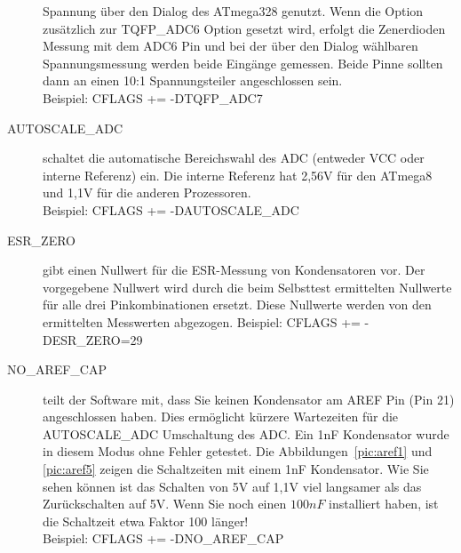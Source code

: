 \begin{description}
Spannung über den Dialog des ATmega328 genutzt. Wenn die Option zusätzlich zur TQFP\_ADC6 Option gesetzt wird,
erfolgt die Zenerdioden Messung mit dem ADC6 Pin und bei der über den Dialog wählbaren Spannungsmessung werden
beide Eingänge gemessen. Beide Pinne sollten dann an einen 10:1 Spannungsteiler angeschlossen sein.\\
Beispiel: CFLAGS += -DTQFP\_ADC7
  \item[AUTOSCALE\_ADC] schaltet die automatische Bereichswahl des ADC (entweder VCC oder interne Referenz) ein.
Die interne Referenz hat 2,56V für den ATmega8 und 1,1V für die anderen Prozessoren.\\
Beispiel: CFLAGS += -DAUTOSCALE\_ADC
  \item[ESR\_ZERO] gibt einen Nullwert für die ESR-Messung von Kondensatoren vor.
Der vorgegebene Nullwert wird durch die beim Selbsttest ermittelten Nullwerte für alle drei Pinkombinationen ersetzt.
 Diese Nullwerte werden von den ermittelten Messwerten abgezogen.
Beispiel: CFLAGS += -DESR\_ZERO=29
  \item[NO\_AREF\_CAP] teilt der Software mit, dass Sie keinen Kondensator am AREF Pin (Pin 21) angeschlossen haben.
Dies ermöglicht kürzere Wartezeiten für die AUTOSCALE\_ADC Umschaltung des ADC.
Ein 1nF Kondensator wurde in diesem Modus ohne Fehler getestet.
Die Abbildungen~\ref{pic:aref1} und \ref{pic:aref5} zeigen die Schaltzeiten mit einem 1nF Kondensator.
Wie Sie sehen können ist das Schalten von 5V auf 1,1V viel langsamer als das Zurückschalten auf 5V.
Wenn Sie noch einen \(100 nF\) installiert haben, ist die Schaltzeit etwa Faktor 100 länger!\\
Beispiel: CFLAGS += -DNO\_AREF\_CAP

\end{description}

